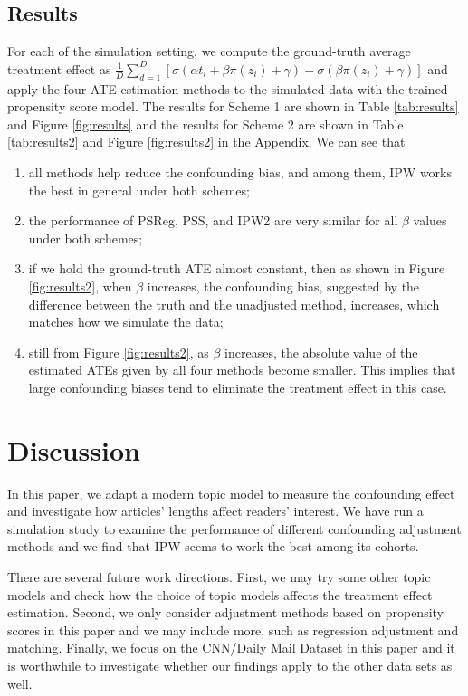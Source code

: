 \documentclass{article}
\begin{document}
	\subsection{Results}
	For each of the simulation setting, we compute the ground-truth average treatment effect as $\frac{1}{D} \sum_{d=1}^D [\sigma(\alpha t_i + \beta \pi(z_i) + \gamma) - \sigma(\beta \pi(z_i) + \gamma)]$ and apply the four ATE estimation methods to the simulated data with the trained propensity score model. The results for Scheme 1 are shown in Table \ref{tab:results} and Figure \ref{fig:results} and the results for Scheme 2 are shown in Table \ref{tab:results2} and Figure \ref{fig:results2} in the Appendix. We can see that 
	
	\begin{enumerate}
		\item all methods help reduce the confounding bias, and among them, IPW works the best in general under both schemes; 
		\item the performance of PSReg, PSS, and IPW2 are very similar for all $\beta$ values under both schemes;
		\item if we hold the ground-truth ATE almost constant, then as shown in Figure \ref{fig:results2}, when $\beta$ increases, the confounding bias, suggested by the difference between the truth and the unadjusted method, increases, which matches how we simulate the data;
		\item still from Figure  \ref{fig:results2}, as $\beta$ increases, the absolute value of the estimated ATEs given by all four methods become smaller. This implies that large confounding biases tend to eliminate the treatment effect in this case.
	\end{enumerate}
	

	
	\section{Discussion}\label{section: conclusion}
	In this paper, we adapt a modern topic model to measure the confounding effect and investigate how articles' lengths affect readers' interest. We have run a simulation study to examine the performance of different confounding adjustment methods and we find that IPW seems to work the best among its cohorts. 
	
	There are several future work directions. First, we may try some other topic models  and check how the choice of topic models affects the treatment effect estimation. Second, we only consider adjustment methods based on propensity scores in this paper and we may include more, such as regression adjustment and matching. Finally, we focus on the CNN/Daily Mail Dataset in this paper and it is worthwhile to investigate whether our findings apply to the other data sets as well. 
	
\end{document}
